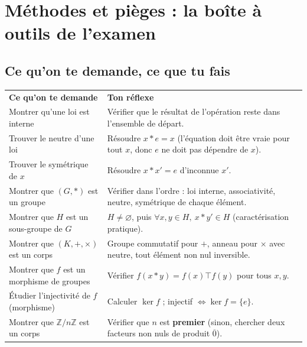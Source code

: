 \documentclass[11pt,a4paper]{article}
\begin{document}
\section{Méthodes et pièges : la boîte à outils de l'examen}

\subsection{Ce qu'on te demande, ce que tu fais}

\begin{center}
\renewcommand{\arraystretch}{1.45}
\sffamily\small
\begin{tabular}{>{\raggedright\arraybackslash}p{7.2cm} >{\raggedright\arraybackslash}p{8cm}}
\rowcolor{qtealdark} \color{white}\bfseries Ce qu'on te demande & \color{white}\bfseries Ton réflexe \\
\rowcolor{tealpale} Montrer qu'une loi est interne & Vérifier que le résultat de l'opération reste dans l'ensemble de départ. \\
Trouver le neutre d'une loi & Résoudre $x*e=x$ (l'équation doit être vraie pour tout $x$, donc $e$ ne doit pas dépendre de $x$). \\
\rowcolor{tealpale} Trouver le symétrique de $x$ & Résoudre $x*x'=e$ d'inconnue $x'$. \\
Montrer que $(G,*)$ est un groupe & Vérifier dans l'ordre : loi interne, associativité, neutre, symétrique de chaque élément. \\
\rowcolor{tealpale} Montrer que $H$ est un sous-groupe de $G$ & $H\ne\varnothing$, puis $\forall x,y\in H,\ x*y'\in H$ (caractérisation pratique). \\
Montrer que $(K,+,\times)$ est un corps & Groupe commutatif pour $+$, anneau pour $\times$ avec neutre, tout élément non nul inversible. \\
\rowcolor{tealpale} Montrer que $f$ est un morphisme de groupes & Vérifier $f(x*y)=f(x)\top f(y)$ pour tous $x,y$. \\
Étudier l'injectivité de $f$ (morphisme) & Calculer $\ker f$ ; injectif $\iff\ker f=\{e\}$. \\
\rowcolor{tealpale} Montrer que $\mathbb{Z}/n\mathbb{Z}$ est un corps & Vérifier que $n$ est \textbf{premier} (sinon, chercher deux facteurs non nuls de produit $\overline0$). \\
\end{tabular}
\end{center}
\end{document}
